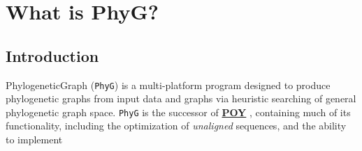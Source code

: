 \documentclass[11pt]{book}
\begin{document}
	\tableofcontents

\chapter{What is PhyG?}

	\section{Introduction}
	PhylogeneticGraph (\texttt{PhyG}) is a multi-platform program designed to produce phylogenetic 
	graphs from input data and graphs via heuristic searching of general phylogenetic graph 
	space. \texttt{PhyG} is the successor of \href{https://github.com/wardwheeler/POY5}{\textbf{POY}}
	\citep{POY2,POY3,POY4,Varonetal2010,POY5, Wheeleretal2015}, containing much of its 
	functionality, including the optimization of \textit{unaligned} sequences, and the ability to implement 
\end{document}
